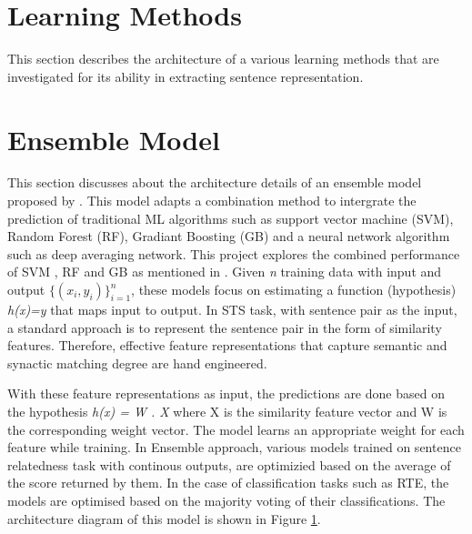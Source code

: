 \documentclass[12pt]{report} %
\begin{document}
\section*{Learning Methods}
This section describes the architecture of a various learning methods that are investigated for its ability in extracting sentence representation. 

\section{Ensemble Model}
\label{ensemble}

	This section discusses about the architecture details of an ensemble model proposed by \cite{tian2017ecnu}. This model adapts a combination method to intergrate the prediction of traditional ML algorithms such as support vector machine (SVM), Random Forest (RF), Gradiant Boosting (GB) and a neural network algorithm such as deep averaging network. This project explores the combined performance of SVM , RF and GB as mentioned in \citep{tian2017ecnu}. Given \textit{n} training data with input and output $ \{(x_i,y_i)\}^{n}_{i=1} $, these models focus on estimating a function (hypothesis) \textit{h(x)=y} that maps input to output. In STS task, with sentence pair as the input, a standard approach is to represent the sentence pair in the form of similarity features. Therefore,  effective feature representations that capture semantic and synactic matching degree are hand engineered. 
	
	With these feature representations as input, the predictions are done based on the hypothesis \textit{h(x) = W . X} where X is the similarity feature vector and W is the corresponding weight vector.  The model learns an appropriate weight for each feature while training. In Ensemble approach, various models trained on sentence relatedness task with continous outputs, are optimizied based on the average of the score returned by them. In the case of classification tasks such as RTE, the models are optimised based on the majority voting of their classifications. The architecture diagram of this model is shown in Figure \ref{ensemble}.
	
\end{document}
